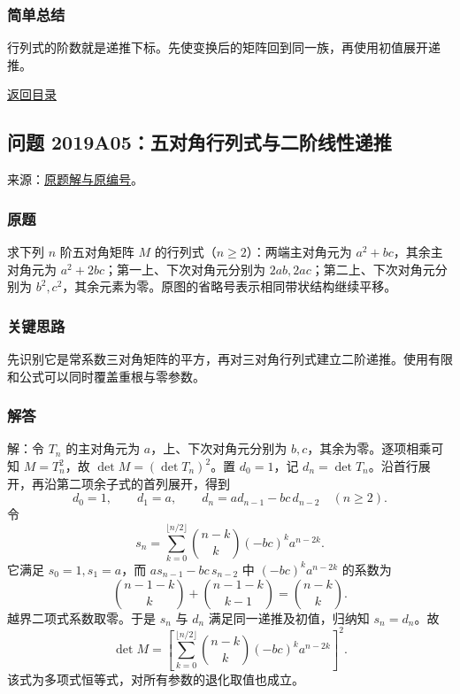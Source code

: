 \documentclass[11pt,a4paper]{article}
\begin{document}
\subsubsection{简单总结}\label{ux7b80ux5355ux603bux7ed3-31}

行列式的阶数就是递推下标。先使变换后的矩阵回到同一族，再使用初值展开递推。

\noindent\hyperref[contents]{返回目录}

\subsection{问题
2019A05：五对角行列式与二阶线性递推}\label{ux95eeux9898-2019a05ux4e94ux5bf9ux89d2ux884cux5217ux5f0fux4e0eux4e8cux9636ux7ebfux6027ux9012ux63a8}

来源：\href{https://zj139.github.io/math-notes/files/problems/19S15-19S15_19A01-19A06.pdf\#page=6}{原题解与原编号}。

\subsubsection{原题}\label{ux539fux9898-32}

求下列 \(n\) 阶五对角矩阵 \(M\) 的行列式（\(n\ge2\)）：两端主对角元为
\(a^2+bc\)，其余主对角元为 \(a^2+2bc\)；第一上、下次对角元分别为
\(2ab,2ac\)；第二上、下次对角元分别为
\(b^2,c^2\)，其余元素为零。原图的省略号表示相同带状结构继续平移。

\subsubsection{关键思路}\label{ux5173ux952eux601dux8def-32}

先识别它是常系数三对角矩阵的平方，再对三对角行列式建立二阶递推。使用有限和公式可以同时覆盖重根与零参数。

\subsubsection{解答}\label{ux89e3ux7b54-32}

解：令 \(T_n\) 的主对角元为 \(a\)，上、下次对角元分别为
\(b,c\)，其余为零。逐项相乘可知 \(M=T_n^2\)，故
\(\det M=(\det T_n)^2\)。置 \(d_0=1\)，记
\(d_n=\det T_n\)。沿首行展开，再沿第二项余子式的首列展开，得到
\[d_0=1,\qquad d_1=a,\qquad d_n=ad_{n-1}-bc\,d_{n-2}\quad(n\ge2).\] 令
\[s_n=\sum_{k=0}^{\lfloor n/2\rfloor}\binom{n-k}{k}(-bc)^k a^{n-2k}.\]
它满足 \(s_0=1,s_1=a\)，而 \(as_{n-1}-bc\,s_{n-2}\) 中
\((-bc)^ka^{n-2k}\) 的系数为
\[\binom{n-1-k}{k}+\binom{n-1-k}{k-1}=\binom{n-k}{k}.\]
越界二项式系数取零。于是 \(s_n\) 与 \(d_n\) 满足同一递推及初值，归纳知
\(s_n=d_n\)。故
\[\boxed{\det M=\left[\sum_{k=0}^{\lfloor n/2\rfloor}\binom{n-k}{k}(-bc)^ka^{n-2k}\right]^2.}\]
该式为多项式恒等式，对所有参数的退化取值也成立。
\end{document}
